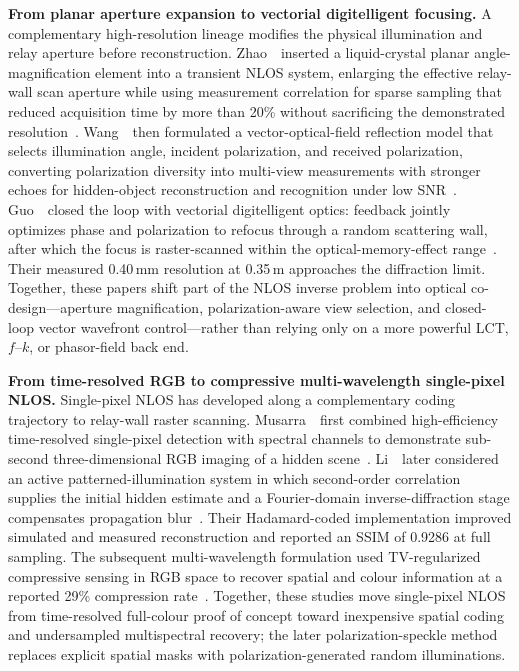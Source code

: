 \vspace{0.8mm}
\noindent \textbf{From planar aperture expansion to vectorial digitelligent focusing.}
A complementary high-resolution lineage modifies the physical illumination and relay aperture before reconstruction. Zhao~\etal~inserted a liquid-crystal planar angle-magnification element into a transient NLOS system, enlarging the effective relay-wall scan aperture while using measurement correlation for sparse sampling that reduced acquisition time by more than 20\% without sacrificing the demonstrated resolution~\cite{zhaoLCPlanarNLOS2024}. Wang~\etal~then formulated a vector-optical-field reflection model that selects illumination angle, incident polarization, and received polarization, converting polarization diversity into multi-view measurements with stronger echoes for hidden-object reconstruction and recognition under low SNR~\cite{wangVectorialMultiviewNLOS2024}. Guo~\etal~closed the loop with vectorial digitelligent optics: feedback jointly optimizes phase and polarization to refocus through a random scattering wall, after which the focus is raster-scanned within the optical-memory-effect range~\cite{guoVectorialDigitelligentNLOS2025}. Their measured 0.40\,mm resolution at 0.35\,m approaches the diffraction limit. Together, these papers shift part of the NLOS inverse problem into optical co-design---aperture magnification, polarization-aware view selection, and closed-loop vector wavefront control---rather than relying only on a more powerful LCT, $f$--$k$, or phasor-field back end.

\vspace{0.8mm}
\noindent \textbf{From time-resolved RGB to compressive multi-wavelength single-pixel NLOS.}
Single-pixel NLOS has developed along a complementary coding trajectory to relay-wall raster scanning. Musarra~\etal~first combined high-efficiency time-resolved single-pixel detection with spectral channels to demonstrate sub-second three-dimensional RGB imaging of a hidden scene~\cite{musarra3DRGBSinglePixel2019}. Li~\etal~later considered an active patterned-illumination system in which second-order correlation supplies the initial hidden estimate and a Fourier-domain inverse-diffraction stage compensates propagation blur~\cite{liActiveModeSinglePixelNLOS2023}. Their Hadamard-coded implementation improved simulated and measured reconstruction and reported an SSIM of 0.9286 at full sampling. The subsequent multi-wavelength formulation used TV-regularized compressive sensing in RGB space to recover spatial and colour information at a reported 29\% compression rate~\cite{liMultiWavelengthSinglePixelNLOS2024}. Together, these studies move single-pixel NLOS from time-resolved full-colour proof of concept toward inexpensive spatial coding and undersampled multispectral recovery; the later polarization-speckle method replaces explicit spatial masks with polarization-generated random illuminations.

